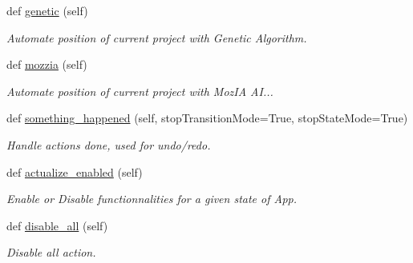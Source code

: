 \begin{DoxyCompactItemize}
\mbox{\label{classInterface_1_1Window_aeca5e024c61d9229428572f0bc7354a6}} 
def \mbox{\hyperlink{classInterface_1_1Window_aeca5e024c61d9229428572f0bc7354a6}{genetic}} (self)
\begin{DoxyCompactList}\small\item\em Automate position of current project with Genetic Algorithm. \end{DoxyCompactList}\item 
def \mbox{\hyperlink{classInterface_1_1Window_a911f0d3daed537c92e5ce12eeb675d5b}{mozzia}} (self)
\begin{DoxyCompactList}\small\item\em Automate position of current project with Moz\+IA AI... \end{DoxyCompactList}\item 
\mbox{\label{classInterface_1_1Window_a260b86228fad9ab21a51cfd0fac48efa}} 
def \mbox{\hyperlink{classInterface_1_1Window_a260b86228fad9ab21a51cfd0fac48efa}{something\+\_\+happened}} (self, stop\+Transition\+Mode=True, stop\+State\+Mode=True)
\begin{DoxyCompactList}\small\item\em Handle actions done, used for undo/redo. \end{DoxyCompactList}\item 
\mbox{\label{classInterface_1_1Window_a25cdfeedb8b4f9019c3a807570cd6604}} 
def \mbox{\hyperlink{classInterface_1_1Window_a25cdfeedb8b4f9019c3a807570cd6604}{actualize\+\_\+enabled}} (self)
\begin{DoxyCompactList}\small\item\em Enable or Disable functionnalities for a given state of App. \end{DoxyCompactList}\item 
\mbox{\label{classInterface_1_1Window_a0a01d1d2c39e7ccf1e1367eca9ae13b1}} 
def \mbox{\hyperlink{classInterface_1_1Window_a0a01d1d2c39e7ccf1e1367eca9ae13b1}{disable\+\_\+all}} (self)
\begin{DoxyCompactList}\small\item\em Disable all action. \end{DoxyCompactList}\item 
\mbox{\label{classInterface_1_1Window_a1cf47f78850ee14db6d1c48318962583}} 

\end{DoxyCompactItemize}
